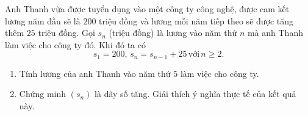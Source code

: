 \begin{vd}%
	Anh Thanh vừa được tuyển dụng vào một công ty công nghệ, được cam kết lương năm đầu sẽ là $200$ triệu đồng và lương mỗi năm tiếp theo sẽ được tăng thêm $25$ triệu đồng. Gọi $s_n$ (triệu đồng) là lương vào năm thứ $n$ mà anh Thanh làm việc cho công ty đó. Khi đó ta có
	$$s_1=200,\, s_n=s_{n-1}+25\, \text{với}\, n \ge 2.$$
	\begin{enumerate}
		\item Tính lương của anh Thanh vào năm thứ $5$ làm việc cho công ty.
		\item Chứng minh $(s_n)$ là dãy số tăng. Giải thích ý nghĩa thực tế của kết quả này. 
	\end{enumerate}
\end{vd}

